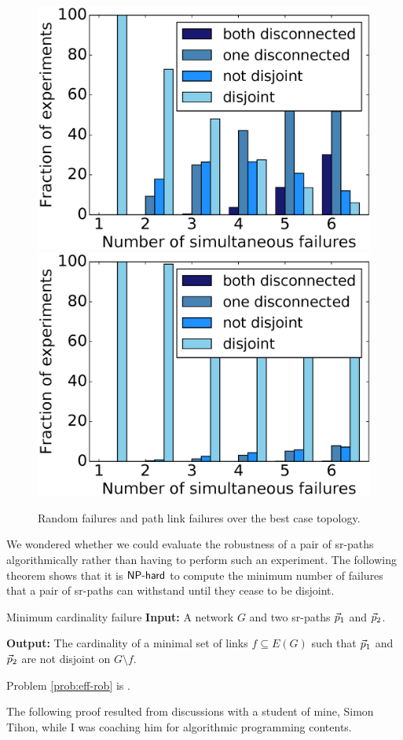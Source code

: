 \begin{figure}
\begin{center}
\includegraphics[width=0.45 \columnwidth]{figures/DialtelecomCz_worst.eps}
\includegraphics[width=0.45 \columnwidth]{figures/DialtelecomCz_random.eps}
\end{center}
\caption{Random failures and path link failures over the best case topology.}
\label{fig:failure_sets_best}
\end{figure}

We wondered whether we could evaluate the robustness of a pair of sr-paths algorithmically rather than 
having to perform such an experiment. The following theorem shows that it is $\textsf{NP-hard}$ to compute the minimum number of failures
that a pair of sr-paths can withstand until they cease to be disjoint.

\begin{problem}{Minimum cardinality failure}
\label{prob:eff-rob} 
\textbf{Input:} A network $G$ and two sr-paths $\vec{p}_1$ and $\vec{p}_2$.

\textbf{Output:} The cardinality of a minimal set of links $f \subseteq E(G)$ such that
$\vec{p}_1$ and $\vec{p}_2$ are not disjoint on $G \setminus f$.
\end{problem}

\begin{theorem}
Problem \ref{prob:eff-rob} is \NPhard. 
\end{theorem}

The following proof resulted from discussions with a student of mine, Simon Tihon, while I was coaching 
him for algorithmic programming contents.

